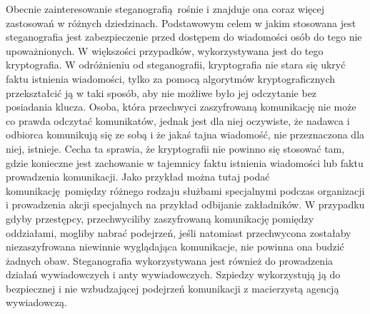 \documentclass[a4paper, twoside]{report}
\begin{document}
        Obecnie zainteresowanie steganografią rośnie i znajduje ona coraz więcej
        zastosowań w różnych dziedzinach. Podstawowym celem w jakim stosowana jest
        steganografia jest zabezpieczenie przed dostępem do wiadomości osób do tego nie
        upoważnionych. W większości przypadków, wykorzystywana jest do tego
        kryptografia. W odróżnieniu od steganografii, kryptografia nie stara się
        ukryć faktu istnienia wiadomości, tylko za pomocą algorytmów kryptograficznych
        przekształcić ją w taki sposób, aby nie możliwe było jej odczytanie bez posiadania
        klucza. Osoba, która przechwyci zaszyfrowaną komunikację nie może co prawda
        odczytać komunikatów, jednak jest dla niej oczywiste, że nadawca i odbiorca
        komunikują się ze sobą i że jakaś tajna wiadomość, nie przeznaczona dla niej,
        istnieje.\cite{DIGITALWATERMARKING} Cecha ta sprawia, że kryptografii nie
        powinno się stosować tam, gdzie konieczne jest zachowanie w tajemnicy
        faktu istnienia wiadomości lub faktu prowadzenia komunikacji. Jako przykład
        można tutaj podać komunikację pomiędzy różnego rodzaju służbami specjalnymi
        podczas organizacji i prowadzenia akcji specjalnych na przykład odbijanie zakładników.
        W przypadku gdyby przestępcy, przechwyciliby zaszyfrowaną komunikację
        pomiędzy oddziałami, mogliby nabrać podejrzeń, jeśli natomiast przechwycona
        zostałaby niezaszyfrowana niewinnie wyglądająca komunikacje, nie powinna ona
        budzić żadnych obaw. Steganografia wykorzystywana jest również do prowadzenia
        działań wywiadowczych i anty wywiadowczych. Szpiedzy wykorzystują ją do
        bezpiecznej i nie wzbudzającej podejrzeń komunikacji z macierzystą agencją
        wywiadowczą.
\end{document}
